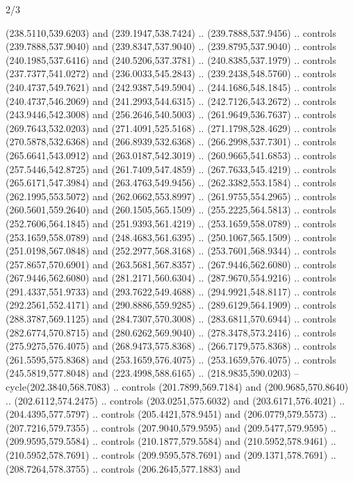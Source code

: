 \begin{flagdescription}{2/3}
\begin{scope}[xshift=0.5\flaglength,yshift=0.5\flagwidth,scale=\flagwidth/525.28]
\begin{scope}[y=0.1mm, x=0.1mm, yscale=-1,shift={(-381.5,-404)}]
\begin{scope}[shift={(5.25001,4.53053)},miter limit=4.00,line width=0.800\lw]
  (238.5110,539.6203) and (239.1947,538.7424) .. (239.7888,537.9456) .. controls
  (239.7888,537.9040) and (239.8347,537.9040) .. (239.8795,537.9040) .. controls
  (240.1985,537.6416) and (240.5206,537.3781) .. (240.8385,537.1979) .. controls
  (237.7377,541.0272) and (236.0033,545.2843) .. (239.2438,548.5760) .. controls
  (240.4737,549.7621) and (242.9387,549.5904) .. (244.1686,548.1845) .. controls
  (240.4737,546.2069) and (241.2993,544.6315) .. (242.7126,543.2672) .. controls
  (243.9446,542.3008) and (256.2646,540.5003) .. (261.9649,536.7637) .. controls
  (269.7643,532.0203) and (271.4091,525.5168) .. (271.1798,528.4629) .. controls
  (270.5878,532.6368) and (266.8939,532.6368) .. (266.2998,537.7301) .. controls
  (265.6641,543.0912) and (263.0187,542.3019) .. (260.9665,541.6853) .. controls
  (257.5446,542.8725) and (261.7409,547.4859) .. (267.7633,545.4219) .. controls
  (265.6171,547.3984) and (263.4763,549.9456) .. (262.3382,553.1584) .. controls
  (262.1995,553.5072) and (262.0662,553.8997) .. (261.9755,554.2965) .. controls
  (260.5601,559.2640) and (260.1505,565.1509) .. (255.2225,564.5813) .. controls
  (252.7606,564.1845) and (251.9393,561.4219) .. (253.1659,558.0789) .. controls
  (253.1659,558.0789) and (248.4683,561.6395) .. (250.1067,565.1509) .. controls
  (251.0198,567.0848) and (252.2977,568.3168) .. (253.7601,568.9344) .. controls
  (257.8657,570.6901) and (263.5681,567.8357) .. (267.9446,562.6080) .. controls
  (267.9446,562.6080) and (281.2171,560.6304) .. (287.9670,554.9216) .. controls
  (291.4337,551.9733) and (293.7622,549.4688) .. (294.9921,548.8117) .. controls
  (292.2561,552.4171) and (290.8886,559.9285) .. (289.6129,564.1909) .. controls
  (288.3787,569.1125) and (284.7307,570.3008) .. (283.6811,570.6944) .. controls
  (282.6774,570.8715) and (280.6262,569.9040) .. (278.3478,573.2416) .. controls
  (275.9275,576.4075) and (268.9473,575.8368) .. (266.7179,575.8368) .. controls
  (261.5595,575.8368) and (253.1659,576.4075) .. (253.1659,576.4075) .. controls
  (245.5819,577.8048) and (223.4998,588.6165) .. (218.9835,590.0203) --
  cycle(202.3840,568.7083) .. controls (201.7899,569.7184) and
  (200.9685,570.8640) .. (202.6112,574.2475) .. controls (203.0251,575.6032) and
  (203.6171,576.4021) .. (204.4395,577.5797) .. controls (205.4421,578.9451) and
  (206.0779,579.5573) .. (207.7216,579.7355) .. controls (207.9040,579.9595) and
  (209.5477,579.9595) .. (209.9595,579.5584) .. controls (210.1877,579.5584) and
  (210.5952,578.9461) .. (210.5952,578.7691) .. controls (209.9595,578.7691) and
  (209.1371,578.7691) .. (208.7264,578.3755) .. controls (206.2645,577.1883) and

\end{scope}
\end{scope}
\end{scope}
\end{flagdescription}
